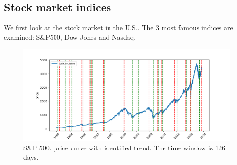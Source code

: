 \subsection{Stock market indices}

We first look at the stock market in the U.S.. The 3 most famous indices are examined: S\&P500, Dow Jones and Nasdaq. 

\begin{figure}[h]
	\centering
	\includegraphics[width=1\linewidth]{chapters/chapter1/figures/sp500_curve_126d}
	\caption{S\&P 500: price curve with identified trend. The time window is 126 days.}
	\label{fig:sp500curve126d}
\end{figure}



